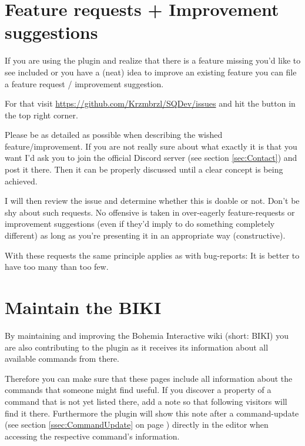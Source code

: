 \documentclass[twoside=false]{scrbook}
\begin{document}
	
	\section{Feature requests + Improvement suggestions}
	\label{sec:FeatureRequests}
	If you are using the plugin and realize that there is a feature missing you'd like to see included or you have a (neat) idea to improve an existing feature you can file a feature request / improvement suggestion.
	
	For that visit \url{https://github.com/Krzmbrzl/SQDev/issues} and hit the  button in the top right corner.
	
	Please be as detailed as possible when describing the wished feature/improvement. If you are not really sure about what exactly it is that you want I'd ask you to join the official Discord server (see section \ref{sec:Contact}) and post it there. Then it can be properly discussed until a clear concept is being achieved.
	
	I will then review the issue and determine whether this is doable or not. Don't be shy about such requests. No offensive is taken in over-eagerly feature-requests or improvement suggestions (even if they'd imply to do something completely different) as long as you're presenting it in an appropriate way (constructive).
	
	With these requests the same principle applies as with bug-reports: It is better to have too many than too few.
	
	
	\section{Maintain the BIKI}
	\label{sec:MaintainBIKI}
	By maintaining and improving the Bohemia Interactive wiki (short: BIKI) you are also contributing to the plugin as it receives its information about all available commands from there.
	
	Therefore you can make sure that these pages include all information about the commands that someone might find useful. If you discover a property of a command that is not yet listed there, add a note so that following visitors will find it there. Furthermore the plugin will show this note after a command-update (see section \ref{ssec:CommandUpdate} on page \pageref{ssec:CommandUpdate}) directly in the editor when accessing the respective command's information.
	
\end{document}
